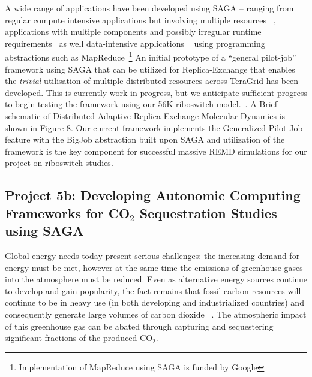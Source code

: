 \documentclass[a4paper,10pt]{article}
\begin{document}
A wide range of applications have been developed using SAGA -- ranging from regular compute intensive applications but involving multiple resources ~\cite{saga_escience07, gmac, REMD-PhilTranA2009}, applications with multiple components and possibly irregular runtime requirements~\cite{saga_loosely_coupled, teragrid08} as well data-intensive applications ~\cite{saga_data_intensive, saga_grid_cloud} using programming abstractions such as MapReduce~\footnote{Implementation of MapReduce using SAGA is funded by Google} An initial prototype of a ``general pilot-job'' framework using SAGA that can be utilized for Replica-Exchange that enables the {\it trivial} utilisation of multiple distributed resources across TeraGrid has been developed. This is currently work in progress, but we anticipate sufficient progress to begin testing the framework using our 56K riboswitch model.~\cite{REMD-PhilTranA2009}. A Brief schematic of Distributed Adaptive Replica Exchange Molecular Dynamics is shown in Figure 8.  Our current framework implements the Generalized Pilot-Job feature with the BigJob abstraction built upon SAGA and utilization of the framework is the key component for successful massive REMD simulations for our project on riboswitch studies.


\subsection*{Project 5b: Developing Autonomic Computing Frameworks for CO$_2$ Sequestration Studies using SAGA}

Global energy needs today present serious challenges: the increasing demand for energy must be met, however at the same time the emissions of greenhouse gases into the atmosphere must be reduced. Even as alternative energy sources continue to develop and gain popularity, the fact remains that fossil carbon resources will continue to be in heavy use (in both developing and industrialized countries) and consequently generate large volumes of carbon dioxide ~\cite{GeoRPT}. The atmospheric impact of this greenhouse gas can be abated through capturing and sequestering significant fractions of the produced CO$_2$.
\end{document}
